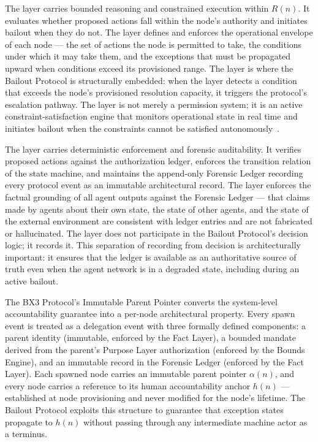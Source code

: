 The \bounds{} layer carries bounded reasoning and constrained execution within $R(n)$. It evaluates whether proposed actions fall within the node's authority and initiates bailout when they do not. The \bounds{} layer defines and enforces the operational envelope of each node --- the set of actions the node is permitted to take, the conditions under which it may take them, and the exceptions that must be propagated upward when conditions exceed its provisioned range. The \bounds{} layer is where the Bailout Protocol is structurally embedded: when the \bounds{} layer detects a condition that exceeds the node's provisioned resolution capacity, it triggers the protocol's escalation pathway. The \bounds{} layer is not merely a permission system; it is an active constraint-satisfaction engine that monitors operational state in real time and initiates bailout when the constraints cannot be satisfied autonomously~\cite{dijkstra1982,bansal2019}.

The \fact{} layer carries deterministic enforcement and forensic auditability. It verifies proposed actions against the authorization ledger, enforces the transition relation of the state machine, and maintains the append-only Forensic Ledger recording every protocol event as an immutable architectural record. The \fact{} layer enforces the factual grounding of all agent outputs against the Forensic Ledger --- that claims made by agents about their own state, the state of other agents, and the state of the external environment are consistent with ledger entries and are not fabricated or hallucinated. The \fact{} layer does not participate in the Bailout Protocol's decision logic; it records it. This separation of recording from decision is architecturally important: it ensures that the ledger is available as an authoritative source of truth even when the agent network is in a degraded state, including during an active bailout.

The BX3 Protocol's Immutable Parent Pointer converts the system-level accountability guarantee into a per-node architectural property. Every spawn event is treated as a delegation event with three formally defined components: a parent identity (immutable, enforced by the Fact Layer), a bounded mandate derived from the parent's Purpose Layer authorization (enforced by the Bounds Engine), and an immutable record in the Forensic Ledger (enforced by the Fact Layer). Each spawned node carries an immutable parent pointer $\alpha(n)$, and every node carries a reference to its human accountability anchor $h(n)$ --- established at node provisioning and never modified for the node's lifetime. The Bailout Protocol exploits this structure to guarantee that exception states propagate to $h(n)$ without passing through any intermediate machine actor as a terminus.

